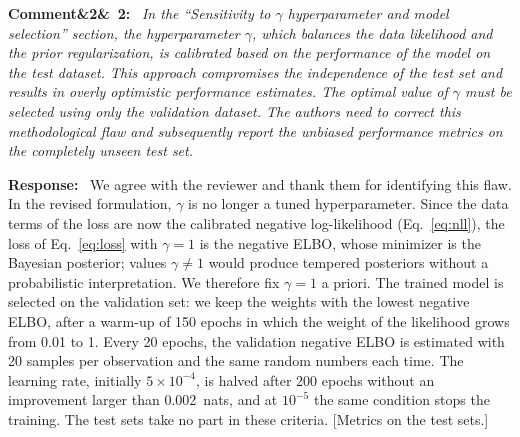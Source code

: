 \documentclass[11pt]{article}
\newenvironment{rcomment}[1]{\par\bigskip\noindent\textbf{Comment\ifx&#1&\else\ #1\fi:}\ \itshape}{\par}
\newenvironment{response}{\par\smallskip\noindent\color{resp}\textbf{Response:}\ }{\par}
\newcommand{\tbd}[1]{\textcolor{note}{\textsf{[#1]}}}
\begin{document}
\begin{rcomment}{2}
In the ``Sensitivity to $\gamma$ hyperparameter and model selection'' section, the hyperparameter $\gamma$, which
balances the data likelihood and the prior regularization, is calibrated based on the performance of the model on the
test dataset. This approach compromises the independence of the test set and results in overly optimistic performance
estimates. The optimal value of $\gamma$ must be selected using only the validation dataset. The authors need to
correct this methodological flaw and subsequently report the unbiased performance metrics on the completely unseen test
set.
\end{rcomment}

\begin{response}
We agree with the reviewer and thank them for identifying this flaw. In the revised formulation, $\gamma$ is no longer
a tuned hyperparameter. Since the data terms of the loss are now the calibrated negative log-likelihood
(Eq.~\eqref{eq:nll}), the loss of Eq.~\eqref{eq:loss} with $\gamma=1$ is the negative ELBO, whose minimizer is the
Bayesian posterior; values $\gamma\neq1$ would produce tempered posteriors without a probabilistic interpretation. We
therefore fix $\gamma=1$ a priori. The trained model is selected on the validation set: we keep the weights with the
lowest negative ELBO, after a warm-up of 150 epochs in which the weight of the likelihood grows from 0.01 to 1. Every 20
epochs, the validation negative ELBO is estimated with 20 samples per observation and the same random numbers each time.
The learning rate, initially $5\times10^{-4}$, is halved after 200 epochs without an improvement larger than 0.002~nats,
and at $10^{-5}$ the same condition stops the training. 
The test sets take no part in these criteria.
\tbd{Metrics on the test sets.}


\end{response}
\end{document}

